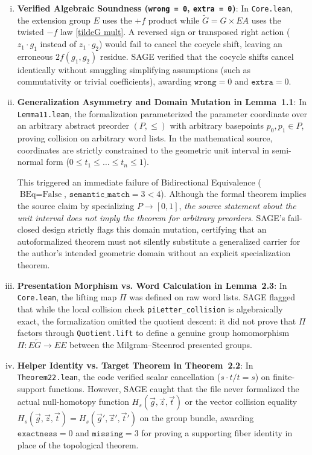 \documentclass[12 pt]{article}
\theoremstyle{definition}
\begin{document}
\begin{enumerate}[(i)]
    \item \textbf{Verified Algebraic Soundness (\texttt{wrong = 0}, \texttt{extra = 0})}:
    In \texttt{Core.lean}, the extension group $E$ uses the $+f$ product while $\tilde{G} = G \times EA$ uses the twisted $-f$ law \eqref{tildeG mult}. A reversed sign or transposed right action ($z_1 \cdot g_1$ instead of $z_1 \cdot g_2$) would fail to cancel the cocycle shift, leaving an erroneous $2f(g_1, g_2)$ residue. SAGE verified that the cocycle shifts cancel identically without smuggling simplifying assumptions (such as commutativity or trivial coefficients), awarding $\texttt{wrong} = 0$ and $\texttt{extra} = 0$.

    \item \textbf{Generalization Asymmetry and Domain Mutation in Lemma~1.1}:
    In \texttt{Lemma11.lean}, the formalization parameterized the parameter coordinate over an arbitrary abstract preorder $(P, \le)$ with arbitrary basepoints $p_0, p_1 \in P$, proving collision on arbitrary word lists. In the mathematical source, coordinates are strictly constrained to the geometric unit interval in semi-normal form ($0 \le t_1 \le \dots \le t_n \le 1$). 
    
    This triggered an immediate failure of Bidirectional Equivalence ($\text{BEq} = \text{False}$, $\texttt{semantic\_match} = 3 < 4$). Although the formal theorem implies the source claim by specializing $P \to [0, 1]$, \emph{the source statement about the unit interval does not imply the theorem for arbitrary preorders}. SAGE's fail-closed design strictly flags this domain mutation, certifying that an autoformalized theorem must not silently substitute a generalized carrier for the author's intended geometric domain without an explicit specialization theorem.

    \item \textbf{Presentation Morphism vs. Word Calculation in Lemma~2.3}:
    In \texttt{Core.lean}, the lifting map $\Pi$ was defined on raw word lists. SAGE flagged that while the local collision check \texttt{piLetter\_collision} is algebraically exact, the formalization omitted the quotient descent: it did not prove that $\Pi$ factors through \texttt{Quotient.lift} to define a genuine group homomorphism $\Pi : E\tilde{G} \to EE$ between the Milgram--Steenrod presented groups.

    \item \textbf{Helper Identity vs. Target Theorem in Theorem~2.2}:
    In \texttt{Theorem22.lean}, the code verified scalar cancellation ($s \cdot t / t = s$) on finite-support functions. However, SAGE caught that the file never formalized the actual null-homotopy function $H_s(\vec{g}, \vec{z}, \vec{t})$ or the vector collision equality $H_s(\vec{g}, \vec{z}, \vec{t}) = H_s(\vec{g}', \vec{z}', \vec{t}')$ on the group bundle, awarding $\texttt{exactness} = 0$ and $\texttt{missing} = 3$ for proving a supporting fiber identity in place of the topological theorem.
\end{enumerate}
\end{document}
